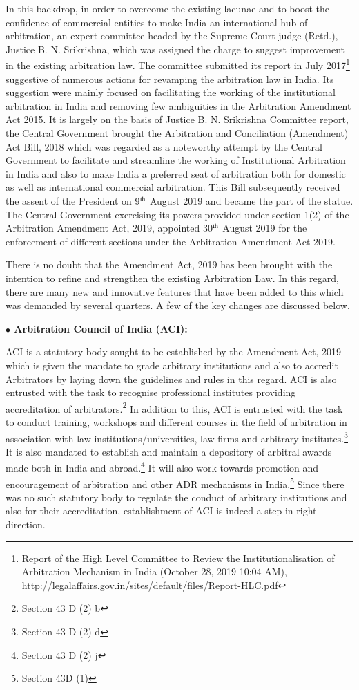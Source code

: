 \begin{multicols}{2}
\noi
In this backdrop, in order to overcome the existing lacunae and to boost the confidence of
commercial entities to make India an international hub of arbitration, an expert committee
headed by the Supreme Court judge (Retd.), Justice B. N. Srikrishna, which was assigned the
charge to suggest improvement in the existing arbitration law. The committee submitted its
report in July 2017\footnote{Report of the High Level Committee to Review the Institutionalisation of Arbitration Mechanism in India (October 28, 2019 10:04 AM), \url{http://legalaffairs.gov.in/sites/default/files/Report-HLC.pdf}}  suggestive of numerous actions for revamping the arbitration law in
India. Its suggestion were mainly focused on facilitating the working of the institutional
arbitration in India and removing few ambiguities in the Arbitration Amendment Act 2015. It
is largely on the basis of Justice B. N. Srikrishna Committee report, the Central Government
brought the Arbitration and Conciliation (Amendment) Act Bill, 2018 which was regarded as
a noteworthy attempt by the Central Government to facilitate and streamline the working of  
Institutional Arbitration in India and also to make India a preferred seat of arbitration both for
domestic as well as international commercial arbitration. This Bill subsequently received the
assent of the President on 9$^{\rm th}$ August 2019 and became the part of the statue. The Central
Government exercising its powers provided under section 1(2) of the Arbitration Amendment
Act, 2019, appointed 30$^{\rm th}$ August 2019 for the enforcement of different sections under the
Arbitration Amendment Act 2019.


\noi
There is no doubt that the Amendment Act, 2019 has been brought with the intention to
refine and strengthen the existing Arbitration Law. In this regard, there are many new and
innovative features that have been added to this which was demanded by several quarters. A
few of the key changes are discussed below.

\noi
{\large \bfseries $\bullet$ Arbitration Council of India (ACI):}

\noi
ACI is a statutory body sought to be established by the Amendment Act, 2019 which is given
the mandate to grade arbitrary institutions and also to accredit Arbitrators by laying down the
guidelines and rules in this regard. ACI is also entrusted with the task to recognise
professional institutes providing accreditation of arbitrators.\footnote{Section 43 D (2) b} 
 In addition to this, ACI is entrusted with the task to conduct training, workshops and different courses in the field of
arbitration in association with law institutions/universities, law firms and arbitrary institutes.\footnote{Section 43 D (2) d}
It is also mandated to establish and maintain a depository of arbitral awards made both in
India and abroad.\footnote{Section 43 D (2) j}
 It will also work towards promotion and encouragement of arbitration and
other ADR mechanisms in India.\footnote{Section 43D (1)}
 Since there was no such statutory body to regulate the
conduct of arbitrary institutions and also for their accreditation, establishment of ACI is
indeed a step in right direction.


\end{multicols}
